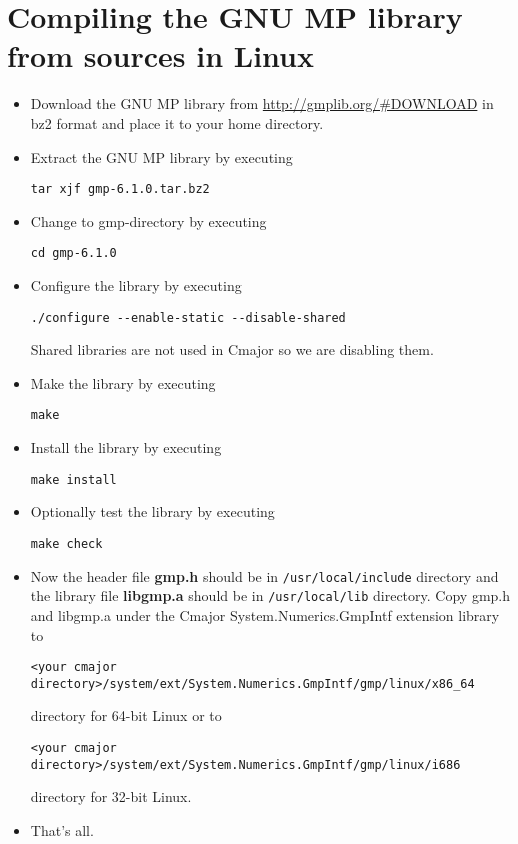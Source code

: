 \documentclass[a4paper,oneside,11.000000pt]{book}
\begin{document}
\section{Compiling the GNU MP library from sources in Linux}

\begin{itemize}

\item
Download the GNU MP library from \url{http://gmplib.org/#DOWNLOAD} in bz2 format
and place it to your home directory.

\item
Extract the GNU MP library by executing
\begin{verbatim}
tar xjf gmp-6.1.0.tar.bz2
\end{verbatim}

\item
Change to gmp-directory by executing
\begin{verbatim}
cd gmp-6.1.0
\end{verbatim}

\item
Configure the library by executing
\begin{verbatim}
./configure --enable-static --disable-shared
\end{verbatim}

Shared libraries are not used in Cmajor so we are disabling them.

\item
Make the library by executing
\begin{verbatim}
make
\end{verbatim}

\item
Install the library by executing
\begin{verbatim}
make install
\end{verbatim}

\item
Optionally test the library by executing
\begin{verbatim}
make check
\end{verbatim}

\item
Now the header file \textbf{gmp.h} should be in \verb|/usr/local/include| directory
and the library file \textbf{libgmp.a} should be in \verb|/usr/local/lib| directory.
Copy gmp.h and libgmp.a under the Cmajor System.Numerics.GmpIntf extension library to 
\begin{verbatim}
<your cmajor directory>/system/ext/System.Numerics.GmpIntf/gmp/linux/x86_64
\end{verbatim}
directory for 64-bit Linux or to 
\begin{verbatim}
<your cmajor directory>/system/ext/System.Numerics.GmpIntf/gmp/linux/i686
\end{verbatim}
directory for 32-bit Linux.

\item
That's all.

\end{itemize}
\end{document}
